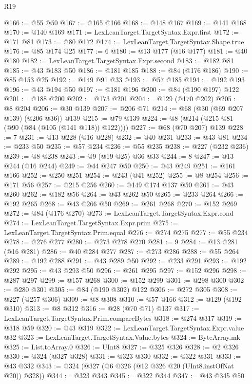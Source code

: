 \begin{lexlean}{R19}
\begin{coremodule}
@166 := @55 @50
@167 := @165 @166
@168 := @148 @167
@169 := @141 @168
@170 := @140 @169
@171 := LexLeanTarget.TargetSyntax.Expr.first
@172 := @171 @81
@173 := @80 @172
@174 := LexLeanTarget.TargetSyntax.Shape.true
@176 := @85 @174 @25
@177 := 6
@180 := @13 @177 (@16 @177)
@181 := @40 @180
@182 := LexLeanTarget.TargetSyntax.Expr.second
@183 := @182 @81
@185 := @43 @183 @50
@186 := @181 @185
@188 := @84 (@176 @186)
@190 := @85 @153 @25
@192 := @149 @91 @33
@193 := @57 @185
@194 := @192 @193
@196 := @43 @194 @50
@197 := @181 @196
@200 := @84 (@190 @197) @122
@201 := @188 @200
@202 := @173 @201
@204 := @129 (@170 @202)
@205 := @8 @204
@206 := @30 @139
@207 := @206 @71
@214 := @68 (@30 (@69 @207 @139) (@206 @36)) @139
@215 := @79 @139
@224 := @8 (@214 (@215 @81 (@90 (@84 (@105 (@141 @118)) @122))))
@227 := @68 (@70 @207) @139
@228 := 7
@231 := @13 @228 (@16 @228)
@232 := @40 @231
@233 := @43 @81
@234 := @233 @50
@235 := @57 @234
@236 := @55 @235
@238 := @227 (@232 @236)
@239 := @8 @238
@243 := @9 (@19 @25) @36 @33
@244 := 8
@247 := @13 @244 (@16 @244)
@249 := @44 @247 @50
@250 := @43 @249
@251 := @161 @166
@252 := @250 @251
@254 := @243 (@41 @252)
@255 := @8 @254
@256 := @171 @56
@257 := @215 @256
@260 := @149 @174 @137 @50
@261 := @43 @260
@262 := @182 @56
@264 := @43 @262 @50
@265 := @233 @264
@266 := @192 @265
@268 := @43 @266 @50
@269 := @261 @268
@270 := @152 @269
@272 := @84 (@176 @270)
@273 := LexLeanTarget.TargetSyntax.Expr.cond
@274 := LexLeanTarget.TargetSyntax.Expr.prim
@275 := LexLeanTarget.TargetSyntax.Prim.equal
@276 := @274 @275
@277 := @55 @234
@278 := @276 @277
@280 := @273 @278 @270
@281 := 9
@284 := @13 @281 (@16 @281)
@286 := @40 @284 @277
@287 := @273 @286
@288 := @55 @264
@289 := @192 @288
@291 := @43 @289 @50
@292 := @233 @291
@293 := @192 @292
@295 := @43 @293 @50
@296 := @261 @295
@297 := @152 @296
@298 := @287 @297
@299 := @157 @268
@300 := @152 @299
@301 := @298 @300
@302 := @280 @301
@305 := @84 (@190 @302) @122
@306 := @272 @305
@308 := @227 (@257 @306)
@309 := @8 @308
@310 := @57 @166
@312 := @129 (@192 @310)
@313 := @8 @312
@316 := @28 (@70 @71) @137
@317 := LexLeanTarget.TargetSyntax.Prim.compareBytes
@318 := @274 @317
@319 := @318 @59
@320 := @43 @319
@322 := LexLeanTarget.TargetSyntax.Expr.value @32
@323 := LexLeanTarget.TargetSyntax.Value.bytes
@324 := ByteArray.mk
@325 := List.toArray.{0}
@326 := UInt8
@327 := @325 @326
@328 := @2 @326
@330 := @324 (@327 @328)
@331 := @323 @330
@332 := @322 @331
@333 := @43 @332
@343 := @324 (@327 (@6 @326 (@12 @326 @20 (UInt8.instOfNat @20)) @328))
@344 := @323 @343
@345 := @322 @344
@347 := @43 @345 @50

\end{coremodule}
\end{lexlean}
